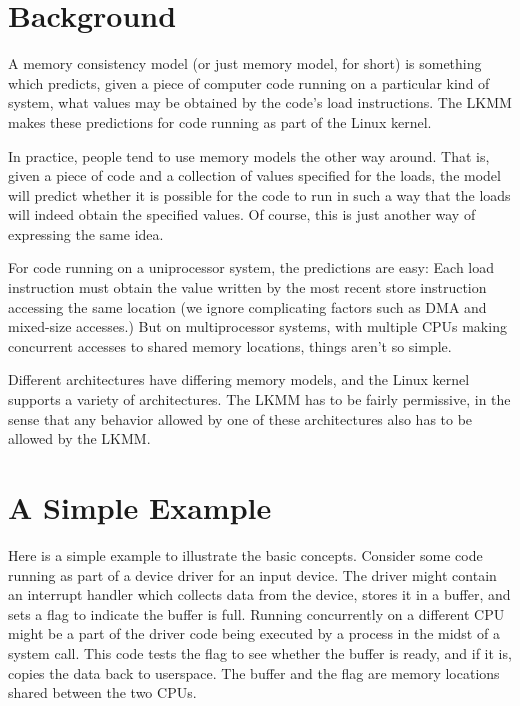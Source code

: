 \section{Background}
\label{sec:docs:explanation:Background}

A memory consistency model (or just memory model, for short) is
something which predicts, given a piece of computer code running on a
particular kind of system, what values may be obtained by the code's
load instructions.
The LKMM makes these predictions for code running as part of the Linux
kernel.

In practice, people tend to use memory models the other way around.
That is, given a piece of code and a collection of values specified
for the loads, the model will predict whether it is possible for the
code to run in such a way that the loads will indeed obtain the
specified values.
Of course, this is just another way of expressing the same idea.

For code running on a uniprocessor system, the predictions are easy:
Each load instruction must obtain the value written by the most recent
store instruction accessing the same location (we ignore complicating
factors such as DMA and mixed-size accesses.)
But on multiprocessor systems, with multiple CPUs making concurrent
accesses to shared memory locations, things aren't so simple.

Different architectures have differing memory models, and the Linux
kernel supports a variety of architectures.
The LKMM has to be fairly permissive, in the sense that any behavior
allowed by one of these architectures also has to be allowed by the LKMM\@.


\section{A Simple Example}
\label{sec:docs:explanation:A Simple Example}

Here is a simple example to illustrate the basic concepts.
Consider some code running as part of a device driver for an input device.
The driver might contain an interrupt handler which collects data from the
device, stores it in a buffer, and sets a flag to indicate the buffer
is full.
Running concurrently on a different CPU might be a part of the driver
code being executed by a process in the midst of a 
system call.
This code tests the flag to see whether the buffer is ready, and if it is,
copies the data back to userspace.
The buffer and the flag are memory locations shared between the two CPUs.

